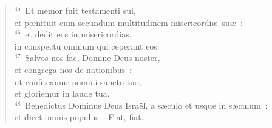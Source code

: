 \begin{flushleft}
\begin{verse}
${}^{45}$~Et memor fuit testamenti sui,\\ et pœnituit eum secundum multitudinem misericordi\ae\ su\ae~:\\
${}^{46}$~et dedit eos in misericordias,\\ in conspectu omnium qui ceperant eos.\\
${}^{47}$~Salvos nos fac, Domine Deus noster,\\ et congrega nos de nationibus~:\\ ut confiteamur nomini sancto tuo,\\ et gloriemur in laude tua.\\
${}^{48}$~Benedictus Dominus Deus Isra\"el, a s\ae culo et usque in s\ae culum~;\\ et dicet omnis populus~: Fiat, fiat.\end{verse}\end{flushleft}


